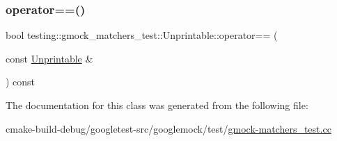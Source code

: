\subsubsection{\texorpdfstring{operator==()}{operator==()}}
{\footnotesize\ttfamily bool testing\+::gmock\+\_\+matchers\+\_\+test\+::\+Unprintable\+::operator== (\begin{DoxyParamCaption}\item[{const \mbox{\hyperlink{classtesting_1_1gmock__matchers__test_1_1Unprintable}{Unprintable}} \&}]{ }\end{DoxyParamCaption}) const\hspace{0.3cm}{\ttfamily [inline]}}



The documentation for this class was generated from the following file\+:\begin{DoxyCompactItemize}
\item 
cmake-\/build-\/debug/googletest-\/src/googlemock/test/\mbox{\hyperlink{gmock-matchers__test_8cc}{gmock-\/matchers\+\_\+test.\+cc}}\end{DoxyCompactItemize}
